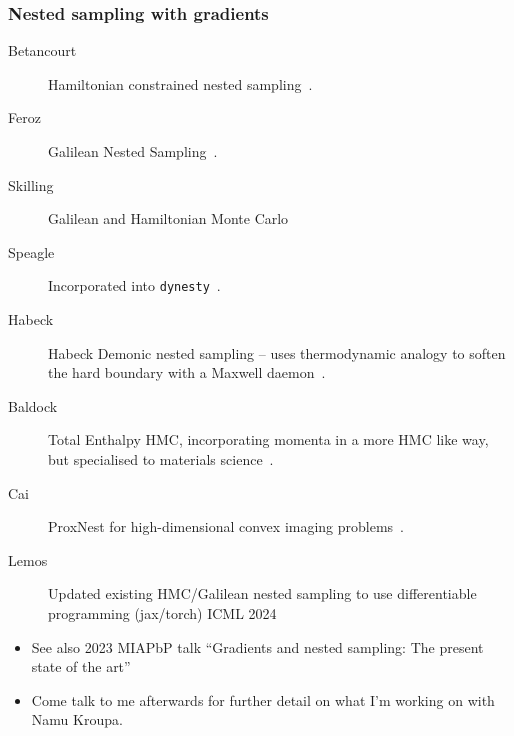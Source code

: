\documentclass[aspectratio=169]{beamer}
\begin{document}
\begin{frame}
    \frametitle{Nested sampling with gradients}
    \begin{description}
        \item[Betancourt] Hamiltonian constrained nested sampling~.
        \item[Feroz] Galilean Nested Sampling~.
        \item[Skilling] Galilean and Hamiltonian Monte Carlo~
        \item[Speagle] Incorporated into \texttt{dynesty}~.
        \item[Habeck] Habeck Demonic nested sampling -- uses thermodynamic analogy to soften the hard boundary with a Maxwell daemon~.
        \item[Baldock] Total Enthalpy HMC, incorporating momenta in a more HMC like way, but specialised to materials science~.
        \item[Cai] ProxNest for high-dimensional convex imaging problems~.
        \item[Lemos] Updated existing HMC/Galilean nested sampling to use differentiable programming (jax/torch) ICML 2024~
    \end{description}
    \begin{itemize}
        \item See also 2023 MIAPbP talk ``Gradients and nested sampling: The present state of the art''
        \item Come talk to me afterwards for further detail on what I'm working on with Namu Kroupa.
    \end{itemize}
\end{frame}
\end{document}
